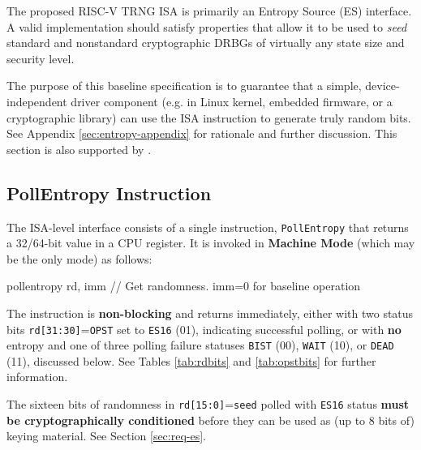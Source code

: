 \label{sec:entropy-source}

    The proposed RISC-V TRNG ISA is primarily an Entropy Source (ES)
    interface. A valid implementation should satisfy properties that allow
    it to be used to \emph{seed} standard and nonstandard cryptographic
    DRBGs of virtually any state size and security level.

    The purpose of this baseline specification is to guarantee that a simple,
    device-independent driver component (e.g. in Linux kernel, embedded
    firmware, or a cryptographic library) can use the ISA instruction to
    generate truly random bits. See Appendix \ref{sec:entropy-appendix} for
    rationale and further discussion. This section is also supported by
    \cite{SaNeMa20}.

\subsection{PollEntropy Instruction}
\label{sec:es-pollentropy}

    The ISA-level interface consists of a single instruction,
    \verb|PollEntropy| that returns a 32/64-bit value in a CPU register.
    It is invoked in {\bf Machine Mode} (which may be the only mode) as
    follows:

\begin{cryptoisa}
pollentropy      rd, imm          // Get randomness. imm=0 for baseline operation
\end{cryptoisa}


    The instruction is {\bf non-blocking} and returns immediately, either
    with two status bits \verb|rd[31:30]|=\verb|OPST| set to
    \verb|ES16| (01), indicating successful polling, or with {\bf no}
    entropy and one of three polling failure statuses \verb|BIST| (00),
    \verb|WAIT| (10), or \verb|DEAD| (11), discussed below.
    See Tables \ref{tab:rdbits} and \ref{tab:opstbits} for further
    information.

    The sixteen bits of randomness in \verb|rd[15:0]|=\verb|seed| polled
    with \verb|ES16| status {\bf must be cryptographically conditioned}
    before they can be used as (up to 8 bits of) keying material. See Section
    \ref{sec:req-es}.


